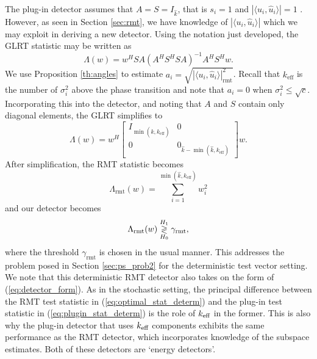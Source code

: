 The plug-in detector assumes that $A=S=I_{\widehat{k}}$, that is $s_i=1$ and $|\langle u_i,\widehat{u}_i\rangle|=1$ . However, as seen in Section \ref{sec:rmt}, we have knowledge of $|\langle u_i,\widehat{u}_i\rangle|$ which we may exploit in deriving a new detector. Using the notation just developed, the GLRT statistic may be written as
\begin{equation*}
\Lambda(w)=w^HSA(A^HS^HSA)^{-1}A^HS^Hw.
\end{equation*}
We use Proposition \ref{th:angles} to estimate $a_i=\sqrt{|\langle u_i,\widehat{u}_i\rangle|^2_{\text{rmt}}}$. Recall that $k_\text{eff}$ is the number of $\sigma_i^2$ above the phase transition and note that $a_i=0$ when $\sigma_i^2\leq\sqrt{c}$. Incorporating this into the detector, and noting that $A$ and $S$ contain only diagonal elements, the GLRT simplifies to
\begin{equation*}
\Lambda(w)=w^H\left[\begin{array}{cc} I_{\min(\widehat{k},k_\text{eff})} & 0 \\ 0 & 0_{\widehat{k}-\min(\widehat{k},k_\text{eff})}\end{array}\right]w.
\end{equation*}
After simplification, the RMT statistic becomes
\begin{equation}\label{eq:optimal_stat_determ}
\boxed{\Lambda_{\text{rmt}}(w) = \sum_{i=1}^{\min(\widehat{k},k_\text{eff})}w_i^2}
\end{equation}
and our detector becomes
\begin{equation}\label{eq:optimal_class_determ}
{\Lambda_{\text{rmt}}(w) \detgtrless \gamma_{\text{rmt}}},
\end{equation}
where the threshold $\gamma_{\text{rmt}}$ is chosen in the usual manner. This addresses the problem posed in Section \ref{sec:ps_prob2} for the deterministic test vector setting.  We note that this deterministic RMT detector also takes on the form of (\ref{eq:detector_form}). As in the stochastic setting, the principal difference between the RMT test statistic in (\ref{eq:optimal_stat_determ}) and the plug-in test statistic in (\ref{eq:plugin_stat_determ}) is the role of $k_\text{eff}$ in the former. This is also why the plug-in detector that uses $k_\text{eff}$ components exhibits the same performance as the RMT detector, which incorporates knowledge of the subspace estimates. Both of these detectors are  `energy detectors'.

